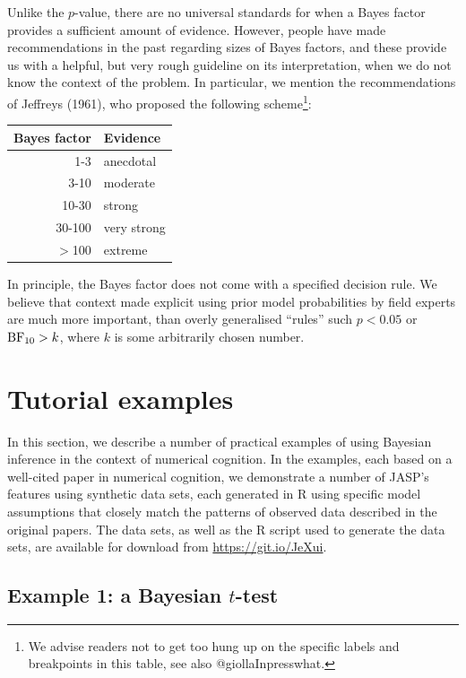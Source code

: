 \documentclass[english,,doc,floatsintext]{apa6}
\let\rmarkdownfootnote\footnote%
\def\footnote{\protect\rmarkdownfootnote}
\begin{document}
Unlike the \(p\)-value, there are no universal standards for when a Bayes factor provides a sufficient amount of evidence. However, people have made recommendations in the past regarding sizes of Bayes factors, and these provide us with a helpful, but very rough guideline on its interpretation, when we do not know the context of the problem. In particular, we mention the recommendations of Jeffreys (1961), who proposed the following scheme\footnote{We advise readers not to get too hung up on the specific labels and breakpoints in this table, see also @giollaInpresswhat.}:

\begin{tabular}{rl}
Bayes factor & Evidence\\
\hline
1-3 & anecdotal\\
3-10 & moderate\\
10-30 & strong\\
30-100 & very strong\\
\( > \)100 & extreme\\
\end{tabular}

In principle, the Bayes factor does not come with a specified decision rule. We believe that context made explicit using prior model probabilities by field experts are much more important, than overly generalised \enquote{rules} such \(p < 0.05\) or \(\textnormal{BF} _{10} > k\), where \(k\) is some arbitrarily chosen number.

\hypertarget{tutorial-examples}{%
\section{Tutorial examples}\label{tutorial-examples}}

In this section, we describe a number of practical examples of using Bayesian inference in the context of numerical cognition. In the examples, each based on a well-cited paper in numerical cognition, we demonstrate a number of JASP's features using synthetic data sets, each generated in R using specific model assumptions that closely match the patterns of observed data described in the original papers. The data sets, as well as the R script used to generate the data sets, are available for download from \url{https://git.io/JeXui}.

\hypertarget{example-1-a-bayesian-t-test}{%
\subsection{\texorpdfstring{Example 1: a Bayesian \(t\)-test}{Example 1: a Bayesian t-test}}\label{example-1-a-bayesian-t-test}}
\end{document}
